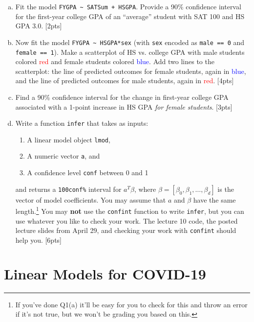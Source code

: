 \documentclass[12pt]{article}
\begin{document}
\begin{enumerate}[(a)]
	\item Fit the model \verb|FYGPA ~ SATSum + HSGPA|. Provide a 90\% confidence interval for the first-year college GPA of an ``average'' student with SAT 100 and HS GPA 3.0. [2pts]
	\item Now fit the model \verb|FYGPA ~ HSGPA*sex| (with \verb|sex| encoded as \verb|male == 0| and \verb|female == 1|). Make a scatterplot of HS vs. college GPA with male students colored \textcolor{red}{red} and female students colored \textcolor{blue}{blue}. Add two lines to the scatterplot: the line of predicted outcomes for female students, again in \textcolor{blue}{blue}, and the line of predicted outcomes for male students, again in \textcolor{red}{red}. [4pts]
	\item Find a 90\% confidence interval for the change in first-year college GPA associated with a 1-point increase in HS GPA \textit{for female students}. [3pts]
	\item Write a function \verb|infer| that takes as inputs:
	\begin{enumerate}
		\item A linear model object \verb|lmod|,
		\item A numeric vector \verb|a|, and
		\item A confidence level \verb|conf| between 0 and 1
	\end{enumerate}
	and returns a \verb|100conf%| interval for $a^T \beta$, where $\beta = [\beta_0, \beta_1, \ldots, \beta_d]$ is the vector of model coefficients. You may assume that $a$ and $\beta$ have the same length.\footnote{If you've done Q1(a) it'll be easy for you to check for this and throw an error if it's not true, but we won't be grading you based on this.}
	You may \textbf{not} use the \verb|confint| function to write \verb|infer|, but you can use whatever you like to check your work. The lecture 10 code, the posted lecture slides from April 29, and checking your work with \verb|confint| should help you. [6pts]
\end{enumerate}

\section{Linear Models for COVID-19}
\end{document}
